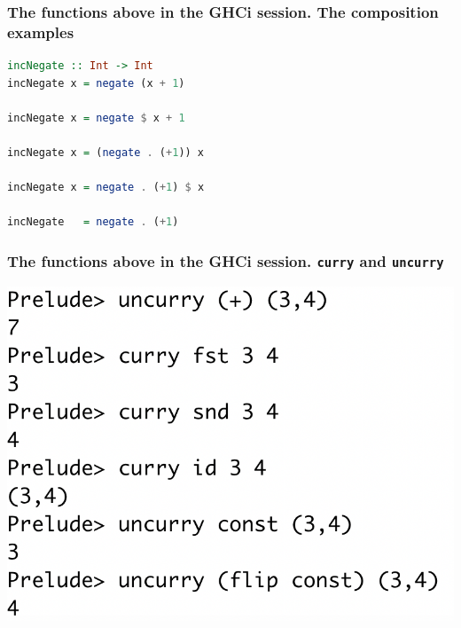 \documentclass[10pt,pdf,utf8,russian,aspectratio=169]{beamer}
\begin{document}
\begin{frame}[fragile]
    \frametitle{The functions above in the GHCi session. The composition examples}

\begin{lstlisting}[language=Haskell]
incNegate :: Int -> Int
incNegate x = negate (x + 1)

incNegate x = negate $ x + 1

incNegate x = (negate . (+1)) x

incNegate x = negate . (+1) $ x

incNegate   = negate . (+1)
\end{lstlisting}
\end{frame}

\begin{frame}
  \frametitle{The functions above in the GHCi session. \verb"curry" and \verb"uncurry"}

  \begin{center}
  \includegraphics[scale=0.554]{Pics/Curry.png}
  \end{center}
\end{frame}
\end{document}
